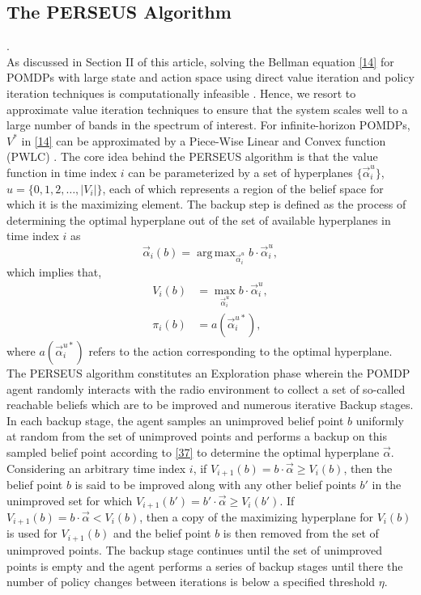 \documentclass[10pt,twocolumn]{IEEEtran}
\newcommand{\bk}[1]{{\color{magenta}{[BK: #1]}}}
\DeclareMathOperator*{\argmax}{arg\,max}
\begin{document}
\subsection{The PERSEUS Algorithm}
\bk{Use $\beta$ instead of $b$ here}.\\
As discussed in Section II of this article, solving the Bellman equation \eqref{14} for POMDPs with large state and action space using direct value iteration and policy iteration techniques is computationally infeasible \bk{citation}. Hence, we resort to approximate value iteration techniques \bk{citation} to ensure that the system scales well to a large number of bands in the spectrum of interest. For infinite-horizon POMDPs, $V^*$ in \eqref{14} can be approximated by a Piece-Wise Linear and Convex function (PWLC) \bk{citation}. The core idea behind the PERSEUS algorithm is that the value function in time index $i$ can be parameterized by a set of hyperplanes $\{\vec{\alpha}_i^{u}\}$, $u = \{0,1,2,\dots,|V_i|\}$, each of which represents a region of the belief space for which it is the maximizing element. The backup step is defined as the process of determining the optimal hyperplane out of the set of available hyperplanes in time index $i$ as
\begin{equation}\label{37}
    \vec{\alpha}_{i}(b) = \argmax_{\vec{\alpha}_{i}^u} b \cdot \vec{\alpha}_{i}^u,
\end{equation}
which implies that,
\begin{equation}\label{38}
    \begin{split}
        V_i(b) &= \max_{\vec{\alpha}_{i}^u} b \cdot \vec{\alpha}_{i}^u,\\
        \pi_i(b) &= a(\vec{\alpha}_i^{u*}),
    \end{split}
\end{equation}
where $a(\vec{\alpha}_i^{u*})$ refers to the action corresponding to the optimal hyperplane. The PERSEUS algorithm constitutes an Exploration phase wherein the POMDP agent randomly interacts with the radio environment to collect a set of so-called reachable beliefs which are to be improved and numerous iterative Backup stages. In each backup stage, the agent samples an unimproved belief point $b$ uniformly at random from the set of unimproved points and performs a backup on this sampled belief point according to \eqref{37} to determine the optimal hyperplane $\vec{\alpha}$. Considering an arbitrary time index $i$, if $V_{i+1}(b) = b \cdot \vec{\alpha} \geq V_{i}(b)$, then the belief point $b$ is said to be improved along with any other belief points $b'$ in the unimproved set for which $V_{i+1}(b') = b' \cdot \vec{\alpha} \geq V_{i}(b')$. If $V_{i+1}(b) = b \cdot \vec{\alpha} < V_{i}(b)$, then a copy of the maximizing hyperplane for $V_i(b)$ is used for $V_{i+1}(b)$ and the belief point $b$ is then removed from the set of unimproved points. The backup stage continues until the set of unimproved points is empty and the agent performs a series of backup stages until there the number of policy changes between iterations is below a specified threshold $\eta$.
\end{document}
